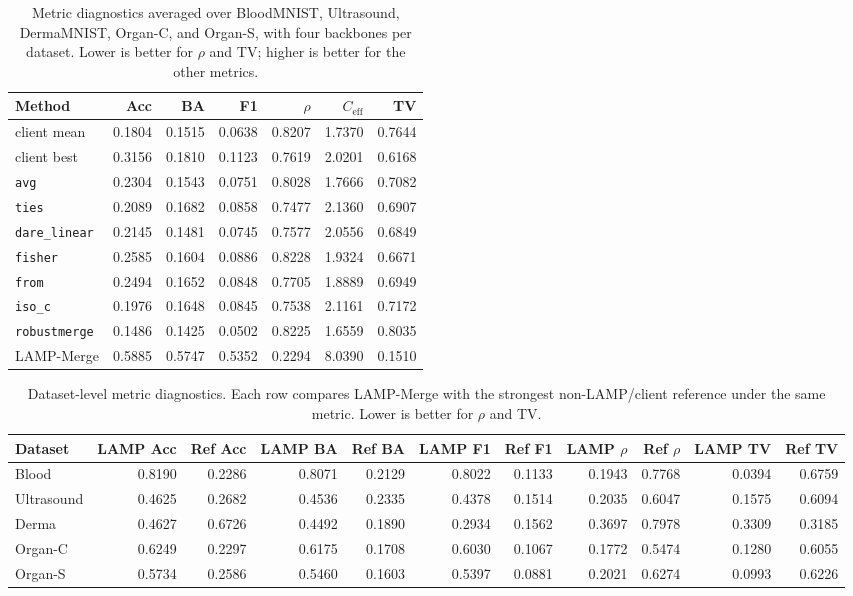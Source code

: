 \begin{table}[t]
\centering
\caption{Metric diagnostics averaged over BloodMNIST, Ultrasound, DermaMNIST, Organ-C, and Organ-S, with four backbones per dataset. Lower is better for $\rho$ and TV; higher is better for the other metrics.}
\label{tab:metric-diagnostics-full}
\scriptsize
\setlength{\tabcolsep}{1.8pt}
\begin{tabular}{lrrrrrr}
\toprule
Method & Acc & BA & F1 & $\rho$ & $C_{\mathrm{eff}}$ & TV \\
\midrule
client mean & 0.1804 & 0.1515 & 0.0638 & 0.8207 & 1.7370 & 0.7644 \\
client best & 0.3156 & 0.1810 & 0.1123 & 0.7619 & 2.0201 & 0.6168 \\
\texttt{avg} & 0.2304 & 0.1543 & 0.0751 & 0.8028 & 1.7666 & 0.7082 \\
\texttt{ties} & 0.2089 & 0.1682 & 0.0858 & 0.7477 & 2.1360 & 0.6907 \\
\texttt{dare\_linear} & 0.2145 & 0.1481 & 0.0745 & 0.7577 & 2.0556 & 0.6849 \\
\texttt{fisher} & 0.2585 & 0.1604 & 0.0886 & 0.8228 & 1.9324 & 0.6671 \\
\texttt{from} & 0.2494 & 0.1652 & 0.0848 & 0.7705 & 1.8889 & 0.6949 \\
\texttt{iso\_c} & 0.1976 & 0.1648 & 0.0845 & 0.7538 & 2.1161 & 0.7172 \\
\texttt{robustmerge} & 0.1486 & 0.1425 & 0.0502 & 0.8225 & 1.6559 & 0.8035 \\
LAMP-Merge & 0.5885 & 0.5747 & 0.5352 & 0.2294 & 8.0390 & 0.1510 \\
\bottomrule
\end{tabular}
\end{table}

\begin{table}[t]
\centering
\caption{Dataset-level metric diagnostics. Each row compares LAMP-Merge with the strongest non-LAMP/client reference under the same metric. Lower is better for $\rho$ and TV.}
\label{tab:metric-diagnostics-dataset}
\scriptsize
\setlength{\tabcolsep}{2.4pt}
\begin{tabular}{lrrrrrrrrrr}
\toprule
Dataset & LAMP Acc & Ref Acc & LAMP BA & Ref BA & LAMP F1 & Ref F1 & LAMP $\rho$ & Ref $\rho$ & LAMP TV & Ref TV \\
\midrule
Blood & 0.8190 & 0.2286 & 0.8071 & 0.2129 & 0.8022 & 0.1133 & 0.1943 & 0.7768 & 0.0394 & 0.6759 \\
Ultrasound & 0.4625 & 0.2682 & 0.4536 & 0.2335 & 0.4378 & 0.1514 & 0.2035 & 0.6047 & 0.1575 & 0.6094 \\
Derma & 0.4627 & 0.6726 & 0.4492 & 0.1890 & 0.2934 & 0.1562 & 0.3697 & 0.7978 & 0.3309 & 0.3185 \\
Organ-C & 0.6249 & 0.2297 & 0.6175 & 0.1708 & 0.6030 & 0.1067 & 0.1772 & 0.5474 & 0.1280 & 0.6055 \\
Organ-S & 0.5734 & 0.2586 & 0.5460 & 0.1603 & 0.5397 & 0.0881 & 0.2021 & 0.6274 & 0.0993 & 0.6226 \\
\bottomrule
\end{tabular}
\end{table}

